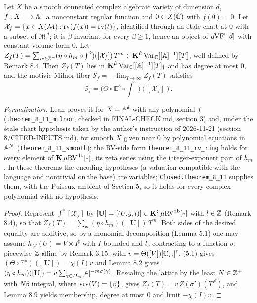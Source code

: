 \setcounter{theorem}{10}
\begin{theorem}
\label{direct-mil}
\leanok
{}
Let $X$ be a smooth connected complex algebraic variety of dimension $d$, $f : X \longrightarrow \mathbb{A}^1$ a nonconstant regular function and $0 \in X(\mathbb{C})$ with $f(0) = 0$. Let $\mathcal X_f = \{x \in X(\mathcal M) : \operatorname{rv}(f(x)) = \operatorname{rv}(t)\}$, identified through an \'etale chart at $0$ with a subset of $\mathcal M^d$; it is $\beta$-invariant for every $\beta \geq 1$, hence an object of $\mu\mathrm{VF}^\diamond[d]$ with constant volume form $0$. Let $Z_f(T) = \sum_{m \in \mathbb{Z}^+} (\eta \circ h_m \circ \int^\diamond)([\mathcal X_f])\, T^m \in \operatorname{\mathbf{K}}^{\hat\mu}\mathrm{Var}_{\mathbb{C}}[[\mathbb{A}]^{-1}][\![T]\!]$, well defined by Remark 8.4. Then $Z_f(T)$ lies in $\operatorname{\mathbf{K}}^{\hat\mu}\mathrm{Var}_{\mathbb{C}}[[\mathbb{A}]^{-1}][T]_{\dagger}$ and has degree at most $0$, and the motivic Milnor fiber $\mathcal S_f = -\lim_{T \to \infty} Z_f(T)$ satisfies \[ \mathcal S_f = \Big(\Theta \circ \mathbb E^\diamond \circ \int^\diamond\Big)([\mathcal X_f]). \]

\emph{Formalization.} Lean proves it for $X = \mathbb{A}^d$ with any polynomial $f$ (\texttt{theorem\_8\_11\_milnor}, checked in FINAL-CHECK.md, section 3) and, under the \'etale chart hypothesis taken by the author's instruction of 2026-11-21 (section 8/CITED-INPUTS.md), for smooth $X$ given near $0$ by polynomial equations in $\mathbb{A}^N$ (\texttt{theorem\_8\_11\_smooth}); the RV-side form \texttt{theorem\_8\_11\_rv\_ring} holds for every element of $\operatorname{\mathbf{K}} \mu\mathrm{RV}^{\operatorname{db}}[*]$, its zeta series using the integer-exponent part of $h_m$. In these theorems the encoding hypotheses (a valuation compatible with the language and nontrivial on the base) are variables; \texttt{Closed.theorem\_8\_11} supplies them, with the Puiseux ambient of Section 5, so it holds for every complex polynomial with no hypothesis.
\end{theorem}

\begin{proof}
\leanok
Represent $\int^\diamond[\mathcal X_f]$ by $[\mathbf U] = [(U, g, l)] \in \operatorname{\mathbf{K}}^\natural \mu\mathrm{RV}^{\operatorname{db}}[*]$ with $l \in \mathbb{Z}$ (Remark 8.4), so that $Z_f(T) = \sum_m (\eta \circ h_m)([\mathbf U])\, T^m$. Both sides of the desired equality are additive, so by a monomial decomposition (Lemma 5.1) one may assume $h_M(U) = V \times I^\sharp$ with $I$ bounded and $l_g$ contracting to a function $\sigma$, piecewise $\mathbb{Z}$-affine by Remark 3.15; with $v = \Theta([V])[\mathbb{G}_m]^\ell$, (5.1) gives $(\Theta \circ \mathbb E^\diamond)([\mathbf U]) = \chi(I)v$ and Lemma 8.2 gives $(\eta \circ h_m)([\mathbf U]) = v \sum_{\gamma \in D_m} [\mathbb{A}]^{-m\sigma(\gamma)}$. Rescaling the lattice by the least $N \in \mathbb{Z}^+$ with $N\beta$ integral, where $\operatorname{vrv}(V) = \{\beta\}$, gives $Z_f(T) = v\, Z(\sigma')(T^N)$, and Lemma 8.9 yields membership, degree at most $0$ and limit $-\chi(I)v$.
\end{proof}

